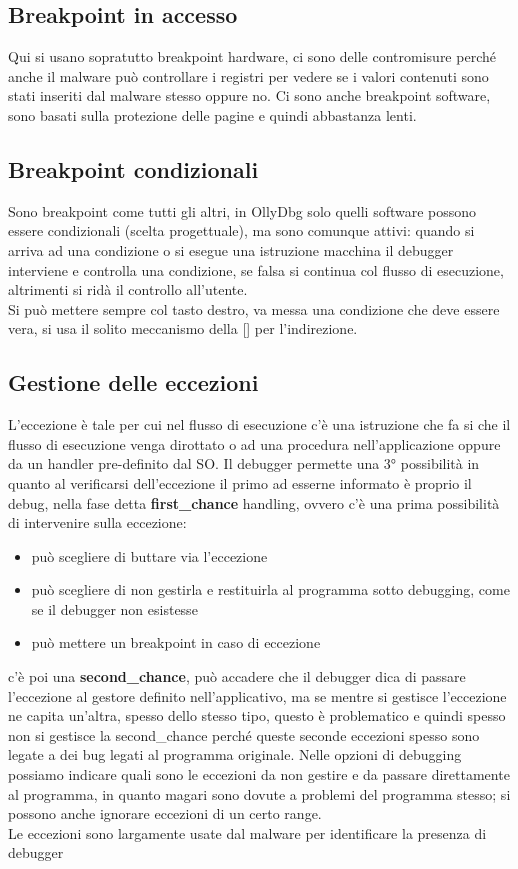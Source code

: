 \documentclass[12pt, oneside]{extbook}
\begin{document}
\subsection{Breakpoint in accesso}
Qui si usano sopratutto breakpoint hardware, ci sono delle contromisure perché anche il malware può controllare i registri per vedere se i valori contenuti sono stati inseriti dal malware stesso oppure no. Ci sono anche breakpoint software, sono basati sulla protezione delle pagine e quindi abbastanza lenti.
\subsection{Breakpoint condizionali}
Sono breakpoint come tutti gli altri, in OllyDbg solo quelli software possono essere condizionali (scelta progettuale), ma sono comunque attivi: quando si arriva ad una condizione o si esegue una istruzione macchina il debugger interviene e controlla una condizione, se falsa si continua col flusso di esecuzione, altrimenti si ridà il controllo all'utente.\\ Si può mettere sempre col tasto destro, va messa una condizione che deve essere vera, si usa il solito meccanismo della [] per l'indirezione.
\subsection{Gestione delle eccezioni}
L'eccezione è tale per cui nel flusso di esecuzione c'è una istruzione che fa si che il flusso di esecuzione venga dirottato o ad una procedura nell'applicazione oppure da un handler pre-definito dal SO. Il debugger permette una 3° possibilità in quanto al verificarsi dell'eccezione il primo ad esserne informato è proprio il debug, nella fase detta \textbf{first\_chance} handling, ovvero c'è una prima possibilità di intervenire sulla eccezione:
\begin{itemize}
\item può scegliere di buttare via l'eccezione
\item può scegliere di non gestirla e restituirla al programma sotto debugging, come se il debugger non esistesse
\item può mettere un breakpoint in caso di eccezione
\end{itemize}
c'è poi una \textbf{second\_chance}, può accadere che il debugger dica di passare l'eccezione al gestore definito nell'applicativo, ma se mentre si gestisce l'eccezione ne capita un'altra, spesso dello stesso tipo, questo è problematico e quindi spesso non si gestisce la second\_chance perché queste seconde eccezioni spesso sono legate a dei bug legati al programma originale. Nelle opzioni di debugging possiamo indicare quali sono le eccezioni da non gestire e da passare direttamente al programma, in quanto magari sono dovute a problemi del programma stesso; si possono anche ignorare eccezioni di un certo range.\\Le eccezioni sono largamente usate dal malware per identificare la presenza di debugger
\end{document}
